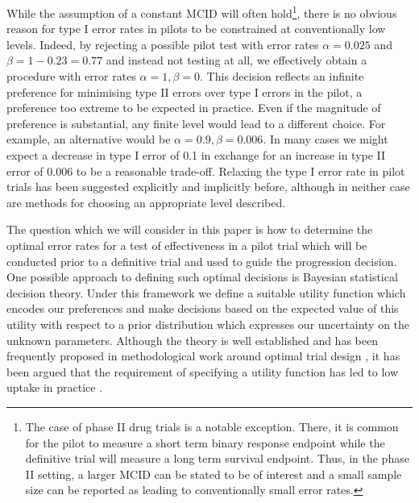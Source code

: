 \documentclass[sagev, Crown]{sagej}
\begin{document}
While the assumption of a constant MCID will often hold\footnote{The case of phase II drug trials is a notable exception. There, it is common for the pilot to measure a short term binary response endpoint while the definitive trial will measure a long term survival endpoint. Thus, in the phase II setting, a larger MCID can be stated to be of interest and a small sample size can be reported as leading to conventionally small error rates.}, there is no obvious reason for type I error rates in pilots to be constrained at conventionally low levels. Indeed, by rejecting a possible pilot test with error rates $\alpha = 0.025$ and $\beta = 1 - 0.23 = 0.77$ and instead not testing at all, we effectively obtain a procedure with error rates $\alpha = 1, \beta = 0$. This decision reflects an infinite preference for minimising type II errors over type I errors in the pilot, a preference too extreme to be expected in practice. Even if the magnitude of preference is substantial, any finite level would lead to a different choice. For example, an alternative would be $\alpha = 0.9, \beta = 0.006$. In many cases we might expect a decrease in type I error of 0.1 in exchange for an increase in type II error of 0.006 to be a reasonable trade-off. Relaxing the type I error rate in pilot trials has been suggested explicitly \cite{Lee2014} and implicitly \cite{Cocks2013} before, although in neither case are methods for choosing an appropriate level described. 

\cite{Lakens2018}


The question which we will consider in this paper is how to determine the optimal error rates for a test of effectiveness in a pilot trial which will be conducted prior to a definitive trial and used to guide the progression decision. One possible approach to defining such optimal decisions is Bayesian statistical decision theory. Under this framework we define a suitable utility function which encodes our preferences and make decisions based on the expected value of this utility with respect to a prior distribution which expresses our uncertainty on 
the unknown parameters. Although the theory is well established \cite{Raiffa1961, Keeney1976} and has been frequently proposed in methodological work around optimal trial design \cite{Lindley1997, Hee2016}, it has been argued that the requirement of specifying a utility function has led to low uptake in practice \cite{Joseph1997a}. 
\end{document}
